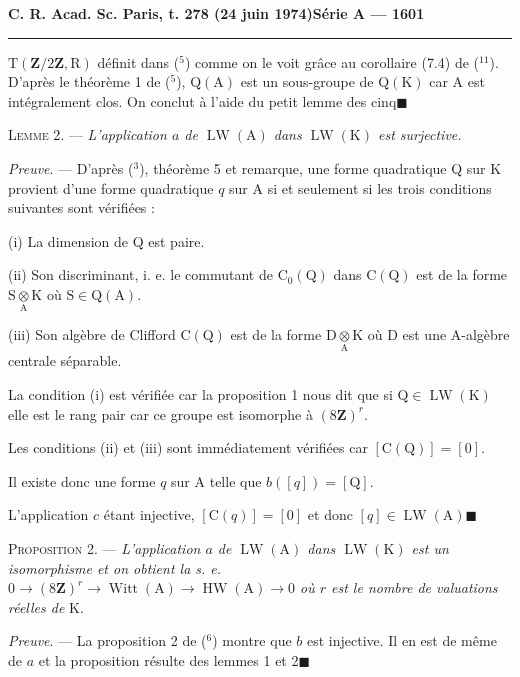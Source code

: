 \textbf{C. R. Acad. Sc. Paris, t. 278 (24 juin 1974)}\hfill\textbf{Série A — 1601}

\rule{\linewidth}{0.4pt}

$\mathrm T(\mathbf Z/2\mathbf Z,\mathrm R)$ définit dans (${}^5$) comme on le voit grâce au corollaire (7.4) de (${}^{11}$). D'après
le théorème 1 de (${}^5$), $\mathrm Q(\mathrm A)$ est un sous-groupe de $\mathrm Q(\mathrm K)$ car A est intégralement clos.
On conclut à l'aide du petit lemme des cinq\quad$\blacksquare$

\textsc{Lemme 2}. — \emph{L'application $a$ de $\operatorname{LW}(\mathrm A)$ dans $\operatorname{LW}(\mathrm K)$ est surjective.}

\emph{Preuve}. — D'après (${}^3$), théorème 5 et remarque, une forme quadratique Q sur K provient
d'une forme quadratique $q$ sur A si et seulement si les trois conditions suivantes sont
vérifiées :

(i) La dimension de Q est paire.

(ii) Son discriminant, i. e. le commutant de $\mathrm C_0(\mathrm Q)$ dans $\mathrm C(\mathrm Q)$ est de la forme $\mathrm S\underset{\mathrm A}{\otimes}\mathrm K$
où $\mathrm S\in\mathrm Q(\mathrm A)$.

(iii) Son algèbre de Clifford $\mathrm C(\mathrm Q)$ est de la forme $\mathrm D\underset{\mathrm A}{\otimes}\mathrm K$ où D est une A-algèbre
centrale séparable.

La condition (i) est vérifiée car la proposition 1 nous dit que si $\mathrm Q\in\operatorname{LW}(\mathrm K)$ elle est
le rang pair car ce groupe est isomorphe à $(8\mathbf Z)^r$.

Les conditions (ii) et (iii) sont immédiatement vérifiées car $[\mathrm C(\mathrm Q)]=[0]$.

Il existe donc une forme $q$ sur A telle que $b([q])=[\mathrm Q]$.

L'application $c$ étant injective, $[\mathrm C(q)]=[0]$ et donc $[q]\in\operatorname{LW}(\mathrm A)$\quad$\blacksquare$

\textsc{Proposition 2}. — \emph{L'application $a$ de $\operatorname{LW}(\mathrm A)$ dans $\operatorname{LW}(\mathrm K)$ est un isomorphisme et on
obtient la s. e. $0\to(8\mathbf Z)^r\to\operatorname{Witt}(\mathrm A)\to\operatorname{HW}(\mathrm A)\to0$ où $r$ est le nombre de valuations
réelles de} K.

\emph{Preuve}. — La proposition 2 de (${}^6$) montre que $b$ est injective. Il en est de même de $a$
et la proposition résulte des lemmes 1 et 2\quad$\blacksquare$

